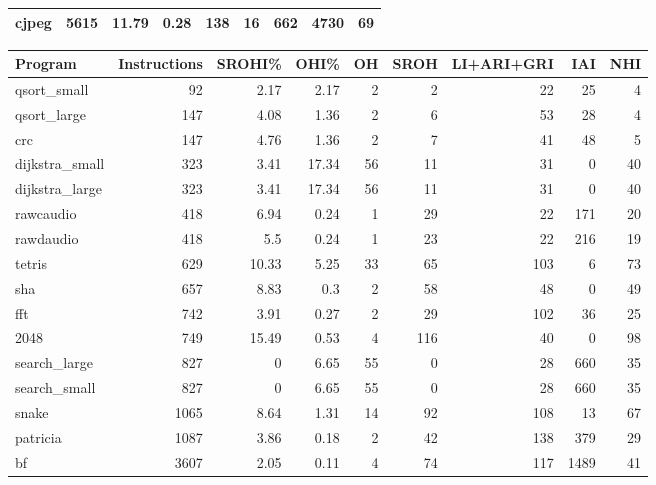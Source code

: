 \begin{tabular}{lrrrrrrrr}
 cjpeg          &     5615 &    11.79 &   0.28 &  138 &   16 &    662 &  4730 &    69 \\
\hline
\end{tabular}\begin{tabular}{lrrrrrrrr}
\hline
 Program        &   Instructions &   SROHI\% &   OHI\% &   OH &   SROH &   LI+ARI+GRI &   IAI &   NHI \\
\hline
 qsort\_small    &             92 &     2.17 &   2.17 &    2 &      2 &           22 &    25 &     4 \\
 qsort\_large    &            147 &     4.08 &   1.36 &    2 &      6 &           53 &    28 &     4 \\
 crc            &            147 &     4.76 &   1.36 &    2 &      7 &           41 &    48 &     5 \\
 dijkstra\_small &            323 &     3.41 &  17.34 &   56 &     11 &           31 &     0 &    40 \\
 dijkstra\_large &            323 &     3.41 &  17.34 &   56 &     11 &           31 &     0 &    40 \\
 rawcaudio      &            418 &     6.94 &   0.24 &    1 &     29 &           22 &   171 &    20 \\
 rawdaudio      &            418 &     5.5  &   0.24 &    1 &     23 &           22 &   216 &    19 \\
 tetris         &            629 &    10.33 &   5.25 &   33 &     65 &          103 &     6 &    73 \\
 sha            &            657 &     8.83 &   0.3  &    2 &     58 &           48 &     0 &    49 \\
 fft            &            742 &     3.91 &   0.27 &    2 &     29 &          102 &    36 &    25 \\
 2048           &            749 &    15.49 &   0.53 &    4 &    116 &           40 &     0 &    98 \\
 search\_large   &            827 &     0    &   6.65 &   55 &      0 &           28 &   660 &    35 \\
 search\_small   &            827 &     0    &   6.65 &   55 &      0 &           28 &   660 &    35 \\
 snake          &           1065 &     8.64 &   1.31 &   14 &     92 &          108 &    13 &    67 \\
 patricia       &           1087 &     3.86 &   0.18 &    2 &     42 &          138 &   379 &    29 \\
 bf             &           3607 &     2.05 &   0.11 &    4 &     74 &          117 &  1489 &    41 \\

\end{tabular}

